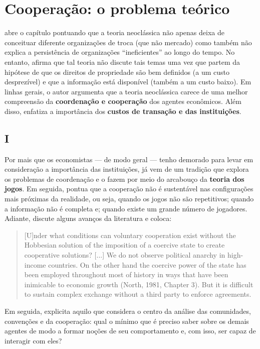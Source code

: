 \section{Cooperação: o problema teórico}

\autor abre o capítulo pontuando que a teoria neoclássica não apenas deixa de conceituar diferente organizações de troca (que não mercado) como também não explica a persistência de organizações ``ineficientes'' ao longo do tempo. No entanto, afirma que tal teoria não discute tais temas uma vez que partem da hipótese de que os direitos de propriedade são bem definidos (a um custo desprezível) e que a informação está disponível (também a um custo baixo). Em linhas gerais, o autor argumenta que a teoria neoclássica carece de uma melhor compreensão da \textbf{coordenação e cooperação} dos agentes econômicos. Além disso, enfatiza a importância dos \textbf{custos de transação e das instituições}.

\subsection{I}

Por mais que os economistas --- de modo geral --- tenho demorado para levar em consideração a importância das instituições, já vem de um tradição que explora os problemas de coordenação e o fazem por meio do arcabouço da \textbf{teoria dos jogos}. Em seguida, \autor pontua que a cooperação não é sustentável nas configurações mais próximas da realidade, ou seja, quando os jogos não são repetitivos; quando a informação não é completa e; quando existe um grande número de jogadores. Adiante, discute alguns avanços da literatura e coloca:

\begin{quotation}
	[U]nder what conditions can voluntary cooperation exist without the Hobbesian solu­tion of the imposition of a coercive state to create cooperative solutions? [...] We do not observe political anarchy in high-income countries. On the other hand the coercive power of the state has been employed throughout most of history in ways that have been inimicable to economic growth (North, 1981, Chapter 3).
	But it is difficult to sustain complex exchange without a third party to
	enforce agreements.
\end{quotation}
Em seguida, \autor explicita aquilo que considera o centro da análise das comunidades, convenções e da cooperação: qual o mínimo que é preciso saber sobre os demais agentes de modo a formar noções de seu comportamento e, com isso, ser capaz de interagir com eles?

